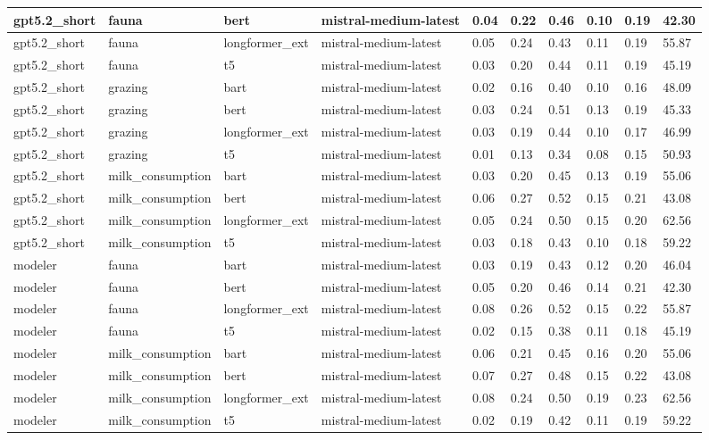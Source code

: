 \begin{tabular}{|l|l|l|l|l|l|l|l|l|l|}
 \hline
 gpt5.2\_short & fauna & bert & mistral-medium-latest & 0.04 & 0.22 & 0.46 & 0.10 & 0.19 & 42.30 \\
 \hline
 gpt5.2\_short & fauna & longformer\_ext & mistral-medium-latest & 0.05 & 0.24 & 0.43 & 0.11 & 0.19 & 55.87 \\
 \hline
 gpt5.2\_short & fauna & t5 & mistral-medium-latest & 0.03 & 0.20 & 0.44 & 0.11 & 0.19 & 45.19 \\
 \hline
 gpt5.2\_short & grazing & bart & mistral-medium-latest & 0.02 & 0.16 & 0.40 & 0.10 & 0.16 & 48.09 \\
 \hline
 gpt5.2\_short & grazing & bert & mistral-medium-latest & 0.03 & 0.24 & 0.51 & 0.13 & 0.19 & 45.33 \\
 \hline
 gpt5.2\_short & grazing & longformer\_ext & mistral-medium-latest & 0.03 & 0.19 & 0.44 & 0.10 & 0.17 & 46.99 \\
 \hline
 gpt5.2\_short & grazing & t5 & mistral-medium-latest & 0.01 & 0.13 & 0.34 & 0.08 & 0.15 & 50.93 \\
 \hline
 gpt5.2\_short & milk\_consumption & bart & mistral-medium-latest & 0.03 & 0.20 & 0.45 & 0.13 & 0.19 & 55.06 \\
 \hline
 gpt5.2\_short & milk\_consumption & bert & mistral-medium-latest & 0.06 & 0.27 & 0.52 & 0.15 & 0.21 & 43.08 \\
 \hline
 gpt5.2\_short & milk\_consumption & longformer\_ext & mistral-medium-latest & 0.05 & 0.24 & 0.50 & 0.15 & 0.20 & 62.56 \\
 \hline
 gpt5.2\_short & milk\_consumption & t5 & mistral-medium-latest & 0.03 & 0.18 & 0.43 & 0.10 & 0.18 & 59.22 \\
 \hline
 modeler & fauna & bart & mistral-medium-latest & 0.03 & 0.19 & 0.43 & 0.12 & 0.20 & 46.04 \\
 \hline
 modeler & fauna & bert & mistral-medium-latest & 0.05 & 0.20 & 0.46 & 0.14 & 0.21 & 42.30 \\
 \hline
 modeler & fauna & longformer\_ext & mistral-medium-latest & 0.08 & 0.26 & 0.52 & 0.15 & 0.22 & 55.87 \\
 \hline
 modeler & fauna & t5 & mistral-medium-latest & 0.02 & 0.15 & 0.38 & 0.11 & 0.18 & 45.19 \\
 \hline
 modeler & milk\_consumption & bart & mistral-medium-latest & 0.06 & 0.21 & 0.45 & 0.16 & 0.20 & 55.06 \\
 \hline
 modeler & milk\_consumption & bert & mistral-medium-latest & 0.07 & 0.27 & 0.48 & 0.15 & 0.22 & 43.08 \\
 \hline
 modeler & milk\_consumption & longformer\_ext & mistral-medium-latest & 0.08 & 0.24 & 0.50 & 0.19 & 0.23 & 62.56 \\
 \hline
 modeler & milk\_consumption & t5 & mistral-medium-latest & 0.02 & 0.19 & 0.42 & 0.11 & 0.19 & 59.22 \\
\hline
\end{tabular}
